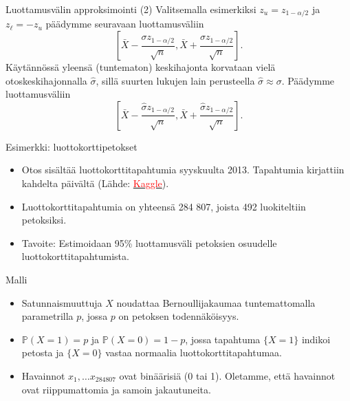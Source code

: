 \documentclass{beamer}
\begin{document}

\begin{frame}{Luottamusvälin approksimointi (2)}
  Valitsemalla esimerkiksi $z_u = z_{1 - \alpha/2}$ ja $z_\ell = -z_u$ päädymme
  seuravaan luottamusväliin
  \begin{equation*}
    \left[\bar X - \frac{\sigma z_{1 - \alpha/2}}{\sqrt{n}},
    \bar X + \frac{\sigma z_{1 - \alpha/2}}{\sqrt{n}}\right].
  \end{equation*}
  \pause
  Käytännössä yleensä (tuntematon) keskihajonta korvataan vielä
  otoskeskihajonnalla $\hat\sigma$, sillä suurten lukujen lain perusteella
  $\hat\sigma\approx\sigma$. Päädymme luottamusväliin
  \begin{equation*}
    \left[\bar X - \frac{\hat\sigma z_{1 - \alpha/2}}{\sqrt{n}},
    \bar X + \frac{\hat\sigma z_{1 - \alpha/2}}{\sqrt{n}}\right].
  \end{equation*}
\end{frame}


\begin{frame}{Esimerkki: luottokorttipetokset}
  \begin{itemize}
    \item Otos sisältää luottokorttitapahtumia syyskuulta 2013. Tapahtumia
    kirjattiin kahdelta päivältä
    (Lähde: \href{https://www.kaggle.com/datasets/mlg-ulb/creditcardfraud?resource=download}{\textcolor{red}{Kaggle}}).
    \pause
    \item Luottokorttitapahtumia on yhteensä 284 807, joista 492 luokiteltiin
    petoksiksi.
    \pause
    \item Tavoite: Estimoidaan 95\% luottamusväli petoksien osuudelle
    luottokorttitapahtumista.
  \end{itemize}
\end{frame}


\begin{frame}{Malli}
  \begin{itemize}
    \item Satunnaismuuttuja $X$ noudattaa Bernoullijakaumaa tuntemattomalla
    parametrilla $p$, jossa $p$ on petoksen todennäköisyys.
    \item $\mathbb{P}\left(X = 1\right) = p$ ja $\mathbb{P}\left(X = 0\right) =
    1 - p$, jossa tapahtuma $\{X = 1\}$ indikoi petosta ja $\{X = 0\}$ vastaa
    normaalia luottokorttitapahtumaa.
    \item Havainnot $x_1, \ldots x_{284807}$ ovat binäärisiä (0 tai 1).
    Oletamme, että havainnot ovat riippumattomia ja samoin jakautuneita.
  \end{itemize}
\end{frame}
\end{document}
